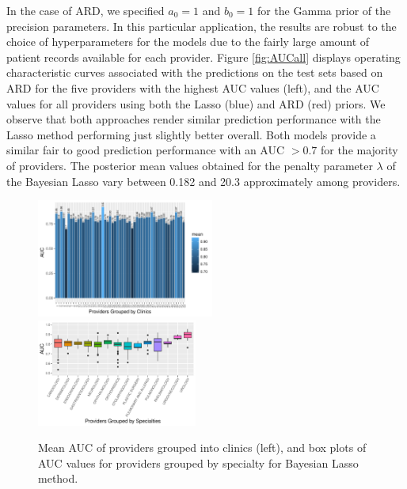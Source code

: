 \documentclass[twoside,11pt]{article}
\begin{document}
In the case of ARD, we specified $a_0=1$ and $b_0=1$ for the Gamma prior of the precision parameters. In this particular application, the results are robust to the choice of hyperparameters for the models due to the fairly large amount of patient records available for each provider. Figure \ref{fig:AUCall} displays operating characteristic curves associated with the predictions on the test sets based on ARD for the five providers with the highest AUC values (left), and the AUC values for all providers using both the Lasso (blue) and ARD (red) priors. We observe that both approaches render similar prediction performance with the Lasso method performing just slightly better overall. Both models provide a similar fair to good prediction performance with an AUC $> 0.7$ for the majority of providers. The posterior mean values obtained for the penalty parameter $\lambda$ of the Bayesian Lasso vary between 0.182 and 20.3 approximately among providers. 

\begin{figure}[H]
\begin{center}
\includegraphics[width = 0.52\textwidth]{fig2/auc-grouped-by-cl4}
\includegraphics[width = 0.47\textwidth]{fig2/auc-grouped-by-sp-box-fixed}
\caption{Mean AUC of providers grouped into clinics (left), and box plots of AUC values for providers grouped by specialty for Bayesian Lasso method.} \label{fig:AUCgroup}
\end{center}
\end{figure}

\vspace{-0.6cm}
\end{document}
